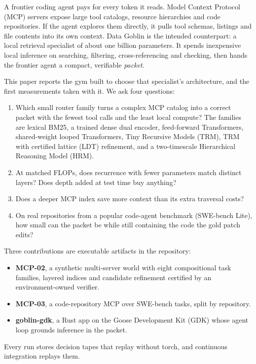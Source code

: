 A frontier coding agent pays for every token it reads. Model Context Protocol (MCP) servers expose large tool
catalogs, resource hierarchies and code repositories. If the agent explores them directly, it pulls tool schemas, listings and
file contents into its own context. Data Goblin is the intended counterpart: a local retrieval specialist of
about one billion parameters. It spends inexpensive local inference on searching, filtering, cross-referencing and checking,
then hands the frontier agent a compact, verifiable \emph{packet}.

This paper reports the gym built to choose that specialist's architecture, and the first measurements taken with it.
We ask four questions:
\begin{enumerate}
\item Which small router family turns a complex MCP catalog into a correct packet with the fewest tool calls and the
least local compute? The families are lexical BM25, a trained dense dual encoder, feed-forward Transformers,
shared-weight looped Transformers, Tiny Recursive Models (TRM), TRM with certified lattice (LDT) refinement, and a
two-timescale Hierarchical Reasoning Model (HRM).
\item At matched FLOPs, does recurrence with fewer parameters match distinct layers? Does depth added at test time
buy anything?
\item Does a deeper MCP index save more context than its extra traversal costs?
\item On real repositories from a popular code-agent benchmark (SWE-bench Lite), how small can the packet be while
still containing the code the gold patch edits?
\end{enumerate}

Three contributions are executable artifacts in the repository:
\begin{itemize}
\item \textbf{MCP-02}, a synthetic multi-server world with eight compositional task families, layered indices
and candidate refinement certified by an environment-owned verifier.
\item \textbf{MCP-03}, a code-repository MCP over SWE-bench tasks, split by repository.
\item \textbf{goblin-gdk}, a Rust app on the Goose Development Kit (GDK) whose agent loop grounds inference in the packet.
\end{itemize}
Every run stores decision tapes that replay without torch, and continuous integration replays them.
